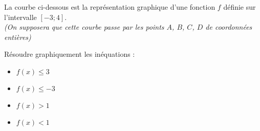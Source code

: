 
% 
La courbe ci-dessous est la représentation graphique d'une fonction $f$ définie sur l'intervalle $\left[-3 ; 4\right]$.
\\
\textit{(On supposera que cette courbe passe par les points $A$, $B$, $C$, $D$ de coordonnées entières)} 
          \begin{center}
          \end{center}
Résoudre graphiquement les inéquations :
\begin{itemize}
     \item
     $f\left(x\right) \leqslant 3$
     \item
     $f\left(x\right) \leqslant -3$
     \item
     $f\left(x\right) > 1$
     \item
     $f\left(x\right) < 1$
\end{itemize}
